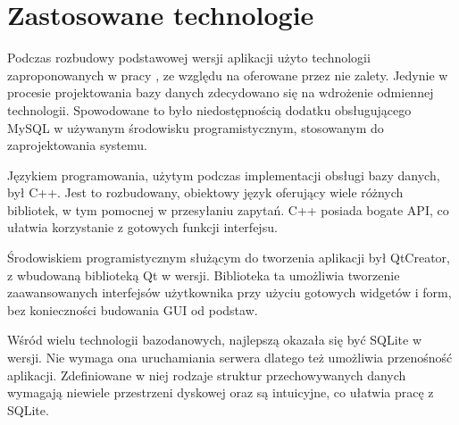 \section{Zastosowane technologie}
\label{sec:implementacja}

Podczas rozbudowy podstawowej wersji aplikacji użyto technologii zaproponowanych w pracy \cite{Gl11}, ze względu na oferowane przez nie zalety. Jedynie w procesie projektowania bazy danych zdecydowano się na wdrożenie odmiennej technologii. Spowodowane to było niedostępnością dodatku obsługującego MySQL w używanym środowisku programistycznym, stosowanym do zaprojektowania systemu.

Językiem programowania, użytym podczas implementacji obsługi bazy danych, był C++. Jest to rozbudowany, obiektowy język oferujący wiele różnych bibliotek, w tym pomocnej w przesyłaniu zapytań. C++ posiada bogate API, co ułatwia korzystanie z gotowych funkcji interfejsu.

Środowiskiem programistycznym służącym do tworzenia aplikacji był QtCreator, z wbudowaną biblioteką Qt w wersji. Biblioteka ta umożliwia tworzenie zaawansowanych interfejsów użytkownika przy użyciu gotowych widgetów i form, bez konieczności budowania GUI od podstaw.

Wśród wielu technologii bazodanowych, najlepszą okazała się być SQLite w wersji. Nie wymaga ona uruchamiania serwera dlatego też umożliwia przenośność aplikacji. Zdefiniowane w niej rodzaje struktur przechowywanych danych wymagają niewiele przestrzeni dyskowej oraz są intuicyjne, co ułatwia pracę z SQLite.  
